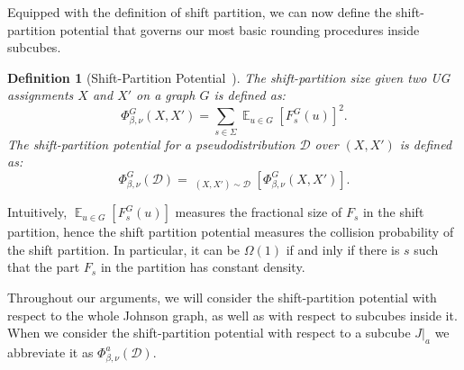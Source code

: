 \documentclass[11pt]{article}
\DeclareMathOperator*{\E}{\mathbb{E}}
\DeclareMathOperator*{\pE}{\widetilde{\mathbb{E}}}
\def \cD {\mathcal{D}}
\def \eps {{\varepsilon}}
\newtheorem{definition}[theorem]{Definition}
\theoremstyle{definition}
\begin{document}

Equipped with the definition of shift partition, we can now define the shift-partition potential that governs 
our most basic rounding procedures inside 
subcubes.
\begin{definition}[Shift-Partition Potential~\cite{BBKSS}]\label{def:shift-partition}
The shift-partition size given two UG assignments $X$ and $X'$ on a graph $G$ is defined as:
\[\Phi^G_{\beta,\nu}(X,X') = \sum_{s \in \Sigma} \E_{u \in G}[F_s^G(u)]^2.\]
The shift-partition potential for a pseudodistribution $\cD$ over $(X,X')$ is defined as:
\[\Phi^G_{\beta,\nu}(\cD) = \pE_{(X,X') \sim \cD}[\Phi^G_{\beta,\nu}(X,X')].\]
\end{definition}
Intuitively, $\E_{u \in G}[F_s^G(u)]$ measures the 
fractional size of $F_s$ in the shift partition, 
hence the shift partition potential measures the 
collision probability of the shift partition. In
particular, it can be $\Omega(1)$ if and inly if there
is $s$ such that the part $F_s$ in the partition 
has constant density.

Throughout our arguments, we will consider the shift-partition potential with respect 
to the whole Johnson graph, as well as with 
respect to subcubes inside it. When we consider the shift-partition potential with respect to a subcube $J|_a$ we abbreviate it as $\Phi^a_{\beta,\nu}(\cD)$.
\end{document}

